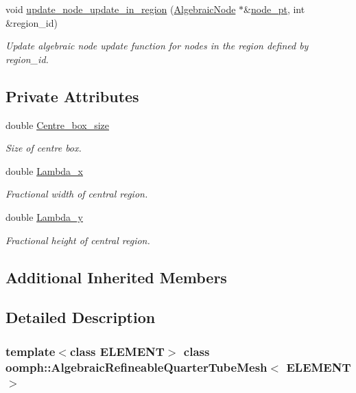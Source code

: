 \begin{DoxyCompactItemize}
void \hyperlink{classoomph_1_1AlgebraicRefineableQuarterTubeMesh_ae2014e91ad7f5a226b35aa96964f4bf1}{update\+\_\+node\+\_\+update\+\_\+in\+\_\+region} (\hyperlink{classoomph_1_1AlgebraicNode}{Algebraic\+Node} $\ast$\&\hyperlink{classoomph_1_1AlgebraicMesh_aedeebbe95d2f8e67e9939cecd1be3933}{node\+\_\+pt}, int \&region\+\_\+id)
\begin{DoxyCompactList}\small\item\em Update algebraic node update function for nodes in the region defined by region\+\_\+id. \end{DoxyCompactList}\end{DoxyCompactItemize}
\subsection*{Private Attributes}
\begin{DoxyCompactItemize}
\item 
double \hyperlink{classoomph_1_1AlgebraicRefineableQuarterTubeMesh_a6006bcac5688f832ff2b6cbaae65102a}{Centre\+\_\+box\+\_\+size}
\begin{DoxyCompactList}\small\item\em Size of centre box. \end{DoxyCompactList}\item 
double \hyperlink{classoomph_1_1AlgebraicRefineableQuarterTubeMesh_a5bb15683ec46078f9e3ab6d9caba54cf}{Lambda\+\_\+x}
\begin{DoxyCompactList}\small\item\em Fractional width of central region. \end{DoxyCompactList}\item 
double \hyperlink{classoomph_1_1AlgebraicRefineableQuarterTubeMesh_a8e3b05ebb0b69e3ca3cbedb39b5b8e47}{Lambda\+\_\+y}
\begin{DoxyCompactList}\small\item\em Fractional height of central region. \end{DoxyCompactList}\end{DoxyCompactItemize}
\subsection*{Additional Inherited Members}


\subsection{Detailed Description}
\subsubsection*{template$<$class E\+L\+E\+M\+E\+NT$>$\newline
class oomph\+::\+Algebraic\+Refineable\+Quarter\+Tube\+Mesh$<$ E\+L\+E\+M\+E\+N\+T $>$}

